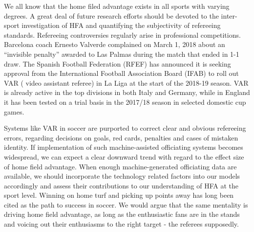 \documentclass[]{interact}
\theoremstyle{plain}%
\theoremstyle{definition}
\theoremstyle{remark}
\begin{document}
We all know that the home filed advantage exists in all sports with varying degrees. A great deal of future research efforts should be devoted to the inter-sport investigation of HFA and quantifying the subjectivity of refereeing standards. 
Refereeing controversies regularly arise in professional competitions. Barcelona coach Ernesto Valverde complained on March 1, 2018 about an “invisible penalty” awarded to Las Palmas during the match that ended  in 1-1 draw.
The Spanish Football Federation (RFEF) has announced it is seeking approval from the International Football Association Board (IFAB) to roll out VAR ( video assistant referee)  in La Liga at the start of the 2018-19 season. VAR is already active in the top divisions in both Italy and Germany, while in England it has been tested on a trial basis in the 2017/18 season in selected domestic cup games.

Systems like VAR in soccer are purported to correct clear and obvious refereeing errors, regarding decisions on goals, red cards, penalties and cases of mistaken identity. If implementation of such machine-assisted officiating  systems becomes widespread, we can expect a clear downward trend with regard to the effect size of home field advantage. When enough machine-generated officiating data are available, we should incorporate the technology related factors into our models accordingly and assess their contributions to our understanding of HFA at the sport level. Winning on home turf and picking up points away has long been cited as the path to success in soccer. We would argue that the same mentality is driving home field advantage, as long as the enthusiastic fans are in the stands and voicing out their enthusiasms to the right target - the referees supposedly.    
 

 


 




 

 
\newpage
 


 
\end{document}
